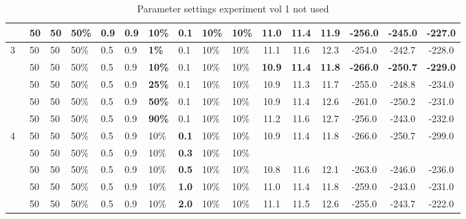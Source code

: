 \begin{sidewaystable}
\begin{tabular}{|l|l|l|l|l|l|l|l|l|l||c|c|c|c|c|c|}
    ~ & 50 & 50 & 50\% & \textbf{0.9} & \textbf{0.9} & 10\% & 0.1 & 10\% & 10\% &  11.0 & 11.4 & 11.9 & -256.0 & -245.0 & -227.0  \\
    \hline
    3 & 50 & 50 & 50\% & 0.5 & 0.9 & \textbf{1\%} & 0.1 & 10\% & 10\% & 11.1 & 11.6 & 12.3 & -254.0 & -242.7 & -228.0  \\
    ~ & 50 & 50 & 50\% & 0.5 & 0.9 & \textbf{10\%} & 0.1 & 10\% & 10\% &  \textbf{10.9} & \textbf{11.4} & \textbf{11.8} & \textbf{-266.0} & \textbf{-250.7} & \textbf{-229.0} \\\
    ~ & 50 & 50 & 50\% & 0.5 & 0.9 & \textbf{25\%} & 0.1 & 10\% & 10\% &  10.9 & 11.3 & 11.7 & -255.0 & -248.8 & -234.0 \\
    ~ & 50 & 50 & 50\% & 0.5 & 0.9 & \textbf{50\%} & 0.1 & 10\% & 10\% &  10.9 & 11.4 & 12.6 & -261.0 & -250.2 & -231.0 \\
    ~ & 50 & 50 & 50\% & 0.5 & 0.9 & \textbf{90\%} & 0.1 & 10\% & 10\% &  11.2 & 11.6 & 12.7 & -256.0 & -243.0 & -232.0 \\
    \hline
    4 & 50 & 50 & 50\% & 0.5 & 0.9 & 10\% & \textbf{0.1} & 10\% & 10\% & 10.9 & 11.4 & 11.8 & -266.0 & -250.7 & -299.0  \\
    ~ & 50 & 50 & 50\% & 0.5 & 0.9 & 10\% & \textbf{0.3} & 10\% & 10\% & ~ & ~ & ~ & ~ & ~ & ~ \\
    ~ & 50 & 50 & 50\% & 0.5 & 0.9 & 10\% & \textbf{0.5} & 10\% & 10\% & 10.8 & 11.6 & 12.1 & -263.0 & -246.0 & -236.0  \\
    ~ & 50 & 50 & 50\% & 0.5 & 0.9 & 10\% & \textbf{1.0} & 10\% & 10\% & 11.0 & 11.4 & 11.8 & -259.0 & -243.0 & -231.0  \\
    ~ & 50 & 50 & 50\% & 0.5 & 0.9 & 10\% & \textbf{2.0} & 10\% & 10\% & 11.1 & 11.5 & 12.6 & -255.0 & -243.7 & -222.0  \\
    \hline
    \end{tabular}
    \caption {Parameter settings experiment vol 1 not used}

    \label{table:pmsNotUsed}
\end{sidewaystable}


